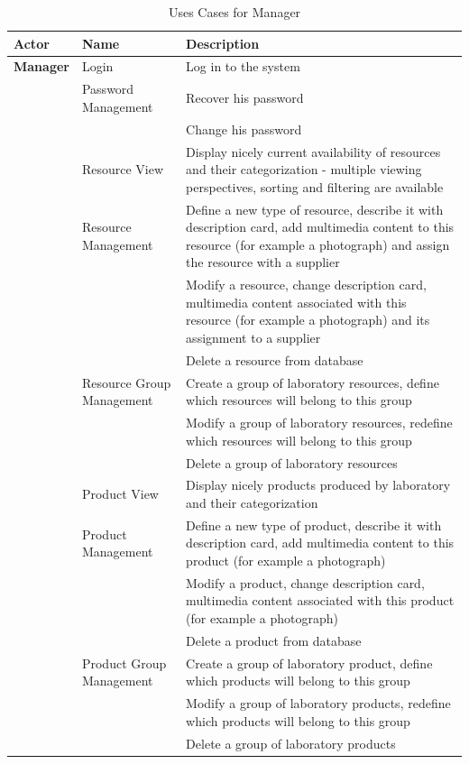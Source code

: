 \documentclass[a4paper,11pt,twoside]{report}
\theoremstyle{definition}
\begin{document}
\begin{longtable}{|p{3cm}|p{3cm}|p{10cm}|}
\caption[Uses Cases for Manager]{Uses Cases for Manager}
\label{Use Cases Manager}
\tabularnewline

\hline
\textbf{Actor} & \textbf{Name} & \textbf{Description} \\ \hline
\textbf{Manager} & Login & Log in to the system\\ \cline{2-3}
\texttt{} & Password \mbox{Management} & Recover his password\\ \cline{3-3}
\texttt{} & & Change his password\\ \cline{2-3}

\texttt{} & Resource View & Display nicely current availability of resources and their categorization - multiple viewing perspectives, sorting and filtering are available\\ \cline{2-3}
\texttt{} & Resource \mbox{Management} & Define a new type of resource, describe it with description card, add multimedia content to this resource (for example a photograph) and assign the resource with a supplier\\ \cline{3-3}
\texttt{} & & Modify a resource, change description card, multimedia content associated with this resource (for example a photograph) and its assignment to a supplier\\ \cline{3-3}
\texttt{} & & Delete a resource from database\\ \cline{2-3}

\texttt{} & Resource Group \mbox{Management} & Create a group of laboratory resources, define which resources will belong to this group\\ \cline{3-3}
\texttt{} & & Modify a group of laboratory resources, redefine which resources will belong to this group\\ \cline{3-3}
\texttt{} & & Delete a group of laboratory resources\\ \cline{2-3}
\texttt{} & Product View & Display nicely products produced by laboratory and their categorization\\ \cline{2-3}
\texttt{} & Product \mbox{Management} & Define a new type of product, describe it with description card, add multimedia content to this product (for example a photograph)\\ \cline{3-3}
\texttt{} & & Modify a product, change description card, multimedia content associated with this product (for example a photograph)\\ \cline{3-3}
\texttt{} & & Delete a product from database\\ \cline{2-3}
\texttt{} & Product Group \mbox{Management} & Create a group of laboratory product, define which products will belong to this group\\ \cline{3-3}
\texttt{} & & Modify a group of laboratory products, redefine which products will belong to this group\\ \cline{3-3}
\texttt{} & & Delete a group of laboratory products\\ \cline{2-3}


\end{longtable}
\end{document}
